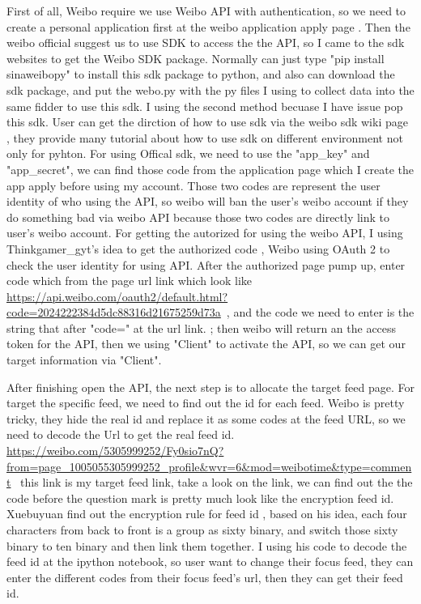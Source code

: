 \documentclass[sigconf]{acmart}
\begin{document}
First of all, Weibo require we use Weibo API with authentication, so we need to create a personal application first at the weibo application apply page \cite{method:01}. Then the weibo official suggest us to use SDK to access the the API, so I came to the sdk websites \cite{method:03} to get the Weibo SDK package. Normally can just type "pip install sinaweibopy" to install this sdk package to python, and also can download the sdk package, and put the webo.py with the py files I using to collect data into the same fidder to use this sdk. I using the second method becuase I have issue pop this sdk. User can get the dirction of how to use sdk via the weibo sdk wiki page \cite{method:04}, they provide many tutorial about how to use sdk on different environment not only for pyhton.  For using Offical sdk, we need to use the "app\_key" and "app\_secret", we can find those code from the application page which I create the app apply before using my account. Those two codes are represent the user identity of who using the API, so weibo will ban the user's weibo account if they do something bad via weibo API because those two codes are directly link to user's weibo account. For getting the autorized for using the weibo API, I using Thinkgamer\_gyt's idea to get the authorized code \cite{method:05}, Weibo using OAuth 2 to check the user identity for using API. After the authorized page pump up, enter code which from the page url link which look like 
\def\emailA{\url{https://api.weibo.com/oauth2/default.html?code=2024222384d5dc88316d21675259d73a}\ }
\emailA{}, and the code we need to enter is the string that after "code=" at the url link.
; then weibo will return an the access token for the API, then we using "Client" to activate the API, so we can get our target information via "Client".

After finishing open the API, the next step is to allocate the target feed page. For target the specific feed, we need to find out the id for each feed. Weibo is pretty tricky, they hide the real id and replace it as some codes at the feed URL, so we need to decode the Url to get the real feed id. 
\def\emailB{\url{https://weibo.com/5305999252/Fy0sio7nQ?from=page_1005055305999252_profile&wvr=6&mod=weibotime&type=comment}\ }
\emailB{} this link is my target feed link, take a look on the link, we can find out the the code before the question mark is pretty much look like the encryption feed id. Xuebuyuan find out the encryption rule for feed id \cite{method:02}, based on his idea, each four characters from back to front is a group as sixty binary, and switch those sixty binary to ten binary and then link them together. I using his code to decode the feed id at the ipython notebook, so user want to change their focus feed, they can enter the different codes from their focus feed's url, then they can get their feed id. 
\end{document}
